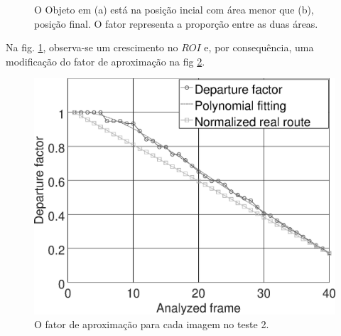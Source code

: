 \begin{figure}[H]
\centering
  \caption{O Objeto em (a) está na posição incial com área menor que (b), 
  posição final. O fator representa a proporção entre as duas áreas.}
  \label{fig:target}
\end{figure}

Na fig. \ref{fig:target}, observa-se um crescimento no $ROI$ e, por
consequência, uma modificação do fator de aproximação na fig \ref{fig:res_grapha_b}.

\begin{figure}[H]
\includegraphics[width=\columnwidth]{images/grapha_b.eps}
\caption{O fator de aproximação para cada imagem no teste 2.}
\label{fig:res_grapha_b}
\end{figure}






